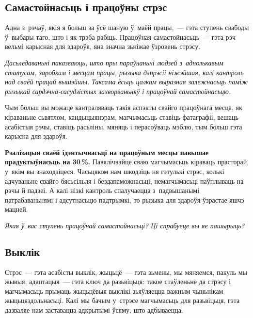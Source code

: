 
\subsection*{Самастойнасьць і працоўны стрэс}

Адна з~рэчаў, якія я больш за ўсё шаную ў~маёй працы,~--- гэта ступень свабоды ў~выбары таго, што і як трэба рабіць. Працоўная самастойнасьць~--- гэта рэч вельмі карысная для здароўя, яна значна зьніжае ўзровень стрэсу. 

\emph{Дасьледаваньні паказваюць, што пры параўнаньні людзей з~аднолькавым статусам, заробкам і месцам працы, рызыка дэпрэсіі ніжэйшая, калі кантроль над сваёй працай вышэйшы. Таксама ёсьць цалкам выразная залежнасьць паміж рызыкай сардэчна-сасудзістых захворваньняў і працоўнай самастойнасьцю.}

Чым больш вы можаце кантраляваць такія аспэкты свайго працоўнага месца, як кіраваньне сьвятлом, кандыцыянэрам, магчымасьць ставіць фатаграфіі, вешаць асабістыя рэчы, ставіць расьліны, мяняць і перасоўваць мэблю, тым больш гэта карысна для здароўя. 

\textbf{Рэалізацыя сваёй ідэнтычнасьці на працоўным месцы павышае прадуктыўнасьць на 30\,\%.} Павялічвайце сваю магчымасьць кіраваць прасторай, у~якім вы знаходзіцеся. Часьцяком нам шкодзіць ня гэтулькі стрэс, колькі адчуваньне свайго бясьсільля і бездапаможнасьці, немагчымасьці паўплываць на рэчы й падзеі. А калі нізкі кантроль спалучаецца з~падвышанымі патрабаваньнямі і адсутнасьцю падтрымкі, то рызыка для здароўя ўзрастае яшчэ мацней.

\emph{Якая ў~вас ступень працоўнай самастойнасьці? Ці спрабуеце вы яе пашырыць?}

\subsection*{Выклік}

Стрэс~--- гэта асабісты выклік, жыцьцё~--- гэта зьмены, мы мяняемся, пакуль мы жывыя, адаптацыя~--- гэта ключ да разьвіцьця: такое стаўленьне да стрэсу і магчымасьць прымаць жыцьцёвыя выклікі зьяўляецца важным чыньнікам жыцьцяздольнасьці. Калі мы бачым у~стрэсе магчымасьць для разьвіцьця, гэта дазваляе нам заставацца адкрытымі ўсяму, што адбываецца.

